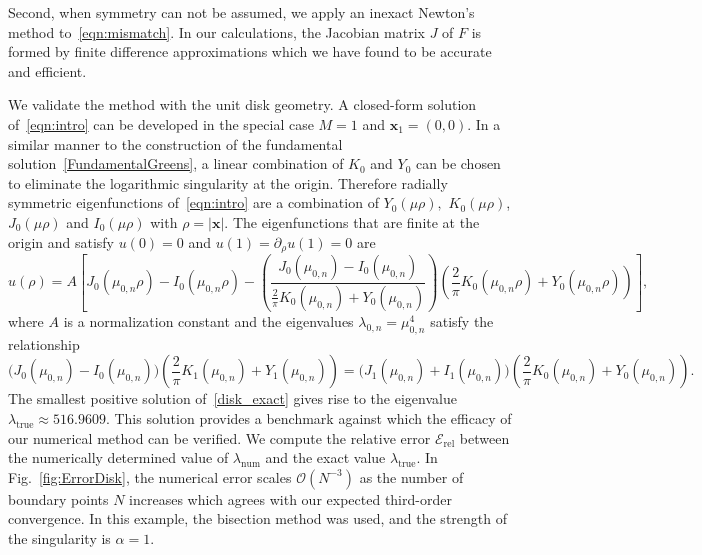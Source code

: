 \documentclass[times]{article}
\newcommand{\xx}{\mathbf{x}}
\newcommand{\bigoh}{\mathcal{O}}
\begin{document}
Second, when symmetry can not be assumed, we apply an inexact Newton's
method to~\eqref{eqn:mismatch}.  In our calculations, the Jacobian
matrix $J$ of $F$ is formed by finite difference approximations which we
have found to be accurate and efficient.

We validate the method with the unit disk geometry. A closed-form
solution of~\eqref{eqn:intro} can be developed in the special case $M=1$
and $\xx_1 =(0,0)$. In a similar manner to the construction of the
fundamental solution~\eqref{FundamentalGreens}, a linear combination of
$K_0$ and $Y_0$ can be chosen to eliminate the logarithmic singularity
at the origin.  Therefore radially symmetric eigenfunctions
of~\eqref{eqn:intro} are a combination of $Y_0(\mu \rho),$ $K_0(\mu \rho)$, 
$J_0(\mu \rho)$ and $I_0(\mu \rho)$ with $\rho = |\xx|$. The eigenfunctions that are finite at the
origin and satisfy $u(0)=0$ and $u(1) = \partial_\rho u(1)=0$ are
\begin{equation*}
u(\rho) = A \left[J_0(\mu_{0,n} \rho) - I_0(\mu_{0,n} \rho) -
\left(\frac{J_0(\mu_{0,n}) - I_0(\mu_{0,n})}{\frac{2}{\pi} K_0(\mu_{0,n})
+ Y_0(\mu_{0,n})} \right) \left(\frac{2}{\pi} K_0(\mu_{0,n} \rho) +
Y_0(\mu_{0,n} \rho)\right) \right],
\end{equation*}
where $A$ is a normalization constant and the eigenvalues $\lambda_{0,n}
= \mu_{0,n}^4$ satisfy the relationship
\begin{equation}\label{disk_exact}
\big(J_0(\mu_{0,n}) - I_0(\mu_{0,n})\big) \left( \frac{2}{\pi}
K_1(\mu_{0,n}) + Y_1(\mu_{0,n}) \right) = \big(J_1(\mu_{0,n}) +
I_1(\mu_{0,n})\big) \left( \frac{2}{\pi} K_0(\mu_{0,n}) + Y_0(\mu_{0,n})
\right).
\end{equation}
The smallest positive solution of~\eqref{disk_exact} gives rise to the
eigenvalue $\lambda_{\textrm{true}} \approx 516.9609.$  This solution
provides a benchmark against which the efficacy of our numerical method
can be verified.  We compute the relative error
$\mathcal{E}_{\textrm{rel}}$ between the numerically determined value of
$\lambda_{\textrm{num}}$ and the exact value $\lambda_{\textrm{true}}$.
In Fig.~\ref{fig:ErrorDisk}, the numerical error scales $\bigoh(N^{-3})$
as the number of boundary points $N$ increases which agrees with our
expected third-order convergence.  In this example, the bisection method
was used, and the strength of the singularity is $\alpha = 1$.
\end{document}
